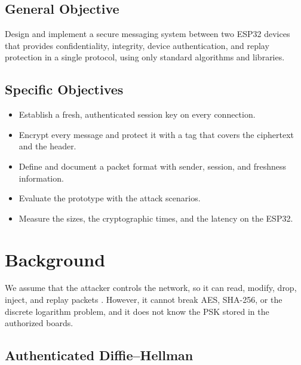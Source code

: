 \documentclass[11pt,a4paper]{article}
\begin{document}
\subsection{General Objective}

Design and implement a secure messaging system between two ESP32 devices that
provides confidentiality, integrity, device authentication, and replay
protection in a single protocol, using only standard algorithms and libraries.

\subsection{Specific Objectives}

\begin{itemize}[leftmargin=1.5em]
    \item Establish a fresh, authenticated session key on every connection.
    \item Encrypt every message and protect it with a tag that covers the
          ciphertext and the header.
    \item Define and document a packet format with sender, session, and
          freshness information.
    \item Evaluate the prototype with the attack scenarios.
    \item Measure the sizes, the cryptographic times, and the latency on the
          ESP32.
\end{itemize}


\section{Background}

We assume that the attacker controls the network, so it can read, modify,
drop, inject, and replay packets \cite{katz2020introduction}. However, it cannot
break AES, SHA-256, or the discrete logarithm problem, and it does not know the
PSK stored in the authorized boards.

\subsection{Authenticated Diffie--Hellman}
\end{document}
